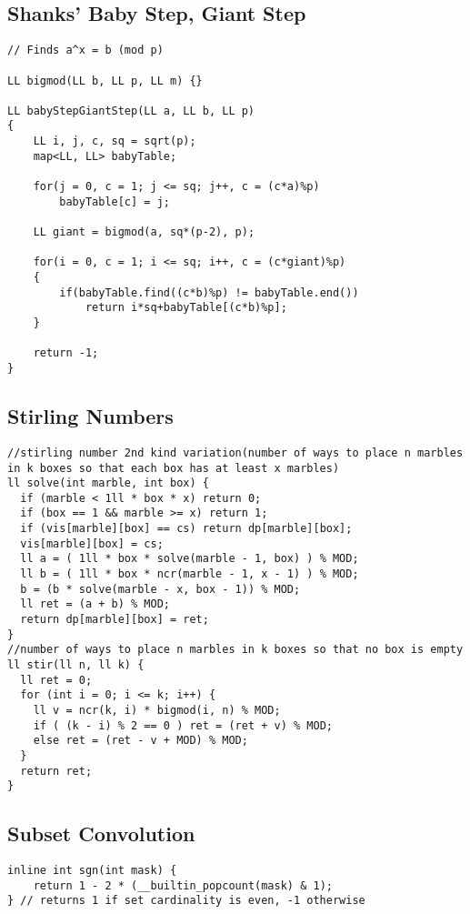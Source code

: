 \documentclass[FSZ,a4paper,onesided]{article}
\begin{document}
\begin{multicols*}{\COLS}
\subsection{Shanks' Baby Step, Giant Step}
\begin{lstlisting}
// Finds a^x = b (mod p)

LL bigmod(LL b, LL p, LL m) {}

LL babyStepGiantStep(LL a, LL b, LL p)
{
    LL i, j, c, sq = sqrt(p);
    map<LL, LL> babyTable;

    for(j = 0, c = 1; j <= sq; j++, c = (c*a)%p)
        babyTable[c] = j;

    LL giant = bigmod(a, sq*(p-2), p);

    for(i = 0, c = 1; i <= sq; i++, c = (c*giant)%p)
    {
        if(babyTable.find((c*b)%p) != babyTable.end())
            return i*sq+babyTable[(c*b)%p];
    }

    return -1;
}
\end{lstlisting}
\subsection{Stirling Numbers}
\begin{lstlisting}
//stirling number 2nd kind variation(number of ways to place n marbles in k boxes so that each box has at least x marbles)
ll solve(int marble, int box) {
  if (marble < 1ll * box * x) return 0;
  if (box == 1 && marble >= x) return 1;
  if (vis[marble][box] == cs) return dp[marble][box];
  vis[marble][box] = cs;
  ll a = ( 1ll * box * solve(marble - 1, box) ) % MOD;
  ll b = ( 1ll * box * ncr(marble - 1, x - 1) ) % MOD;
  b = (b * solve(marble - x, box - 1)) % MOD;
  ll ret = (a + b) % MOD;
  return dp[marble][box] = ret;
}
//number of ways to place n marbles in k boxes so that no box is empty
ll stir(ll n, ll k) {
  ll ret = 0;
  for (int i = 0; i <= k; i++) {
    ll v = ncr(k, i) * bigmod(i, n) % MOD;
    if ( (k - i) % 2 == 0 ) ret = (ret + v) % MOD;
    else ret = (ret - v + MOD) % MOD;
  }
  return ret;
}
\end{lstlisting}
\subsection{Subset Convolution}
\begin{lstlisting}
inline int sgn(int mask) {
    return 1 - 2 * (__builtin_popcount(mask) & 1);
} // returns 1 if set cardinality is even, -1 otherwise


\end{lstlisting}
\end{multicols*}
\end{document}

